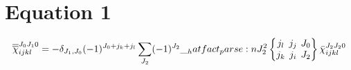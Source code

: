\documentclass{scrartcl}
\newcommand{\sixj}[6]{\begingroup\setlength{\arraycolsep}{0.2em}\begin{Bmatrix} #1 & #2 & #3 \\ #4 & #5 & #6 \end{Bmatrix}\endgroup}
\begin{document}
\section{Equation 1}
\begin{dmath*}
\overline{\overline{\chi}}_{i j k l}^{{J}_{0} {J}_{1} 0} = -\delta_{{J}_{1},{J}_{0}} \* (-1)^{{J}_{0}+{j}_{k}+{j}_{l}} \* \sum_{{J}_{2}} \* (-1)^{{J}_{2}} \* \hatfact{{J}_{2}^{2}} \* \sixj{{j}_{l}}{{j}_{j}}{{J}_{0}}{{j}_{k}}{{j}_{i}}{{J}_{2}} \* \bar{\chi}_{i j k l}^{{J}_{2} {J}_{2} 0}
\end{dmath*}
\end{document}
